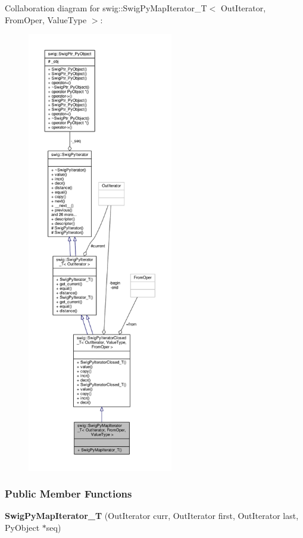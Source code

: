 Collaboration diagram for swig\+:\+:Swig\+Py\+Map\+Iterator\+\_\+T$<$ Out\+Iterator, From\+Oper, Value\+Type $>$\+:
\nopagebreak
\begin{figure}[H]
\begin{center}
\leavevmode
\includegraphics[height=550pt]{d8/d2d/structswig_1_1SwigPyMapIterator__T__coll__graph}
\end{center}
\end{figure}
\subsubsection*{Public Member Functions}
\begin{DoxyCompactItemize}
\item 
{\bf Swig\+Py\+Map\+Iterator\+\_\+T} (Out\+Iterator curr, Out\+Iterator first, Out\+Iterator last, Py\+Object $\ast$seq)
\end{DoxyCompactItemize}
